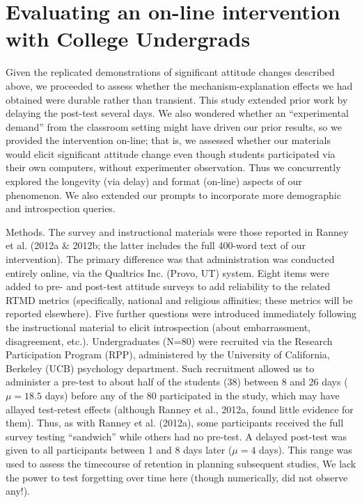 \section{Evaluating an on-line intervention with College Undergrads}

Given the replicated demonstrations of significant attitude changes described
above, we proceeded to assess whether the mechanism-explanation effects we had
obtained were durable rather than transient. This study extended prior work by
delaying the post-test several days. We also wondered whether an ``experimental
demand'' from the classroom setting might have driven our prior results, so we
provided the intervention on-line; that is, we assessed whether our materials
would elicit significant attitude change even though students participated via
their own computers, without experimenter observation. Thus we concurrently
explored the longevity (via delay) and format (on-line) aspects of our
phenomenon. We also extended our prompts to incorporate more demographic and
introspection queries.

Methods. The survey and instructional materials were those reported in Ranney et
al. (2012a \& 2012b; the latter includes the full 400-word text of our
intervention). The primary difference was that administration was conducted
entirely online, via the Qualtrics Inc. (Provo, UT) system. Eight items were
added to pre- and post-test attitude surveys to add reliability to the related
RTMD metrics (specifically, national and religious affinities; these metrics
will be reported elsewhere). Five further questions were introduced immediately
following the instructional material to elicit introspection (about
embarrassment, disagreement, etc.).  Undergraduates (N=80) were recruited via
the Research Participation Program (RPP), administered by the University of
California, Berkeley (UCB) psychology department. Such recruitment allowed us to
administer a pre-test to about half of the students (38) between 8 and 26 days
($\mu=18.5$ days) before any of the 80 participated in the study, which may have
allayed test-retest effects (although Ranney et al., 2012a, found little
evidence for them). Thus, as with Ranney et al. (2012a), some participants
received the full survey testing ``sandwich'' while others had no pre-test. A
delayed post-test was given to all participants between 1 and 8 days later
($\mu=4$ days). This range was used to assess the timecourse of retention in
planning subsequent studies, We lack the power to test forgetting over time here
(though numerically, did not observe any!).

